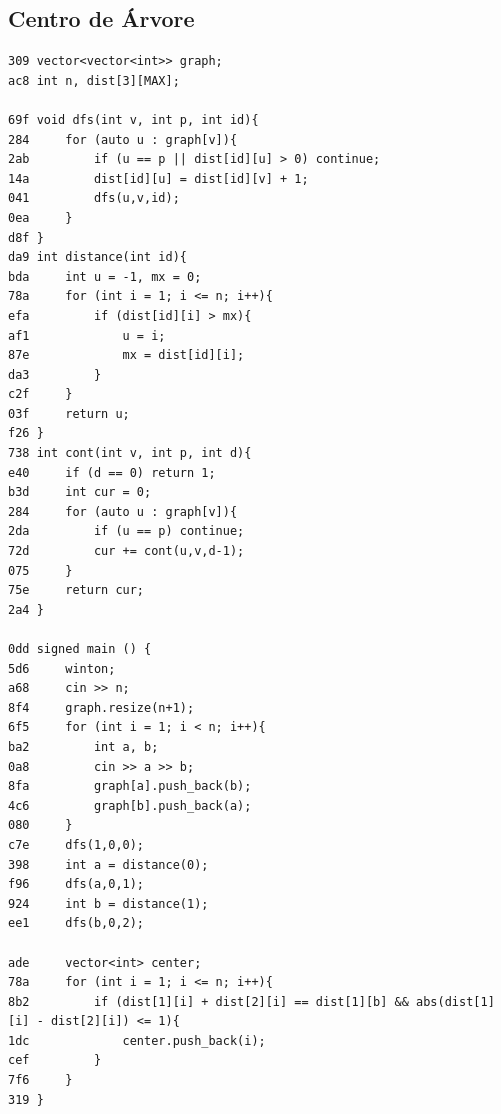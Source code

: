 \documentclass[11pt, a4paper, twoside]{article}
\begin{document}
\subsection{Centro de Árvore}
\begin{lstlisting}
309 vector<vector<int>> graph;
ac8 int n, dist[3][MAX];

69f void dfs(int v, int p, int id){
284     for (auto u : graph[v]){
2ab         if (u == p || dist[id][u] > 0) continue;
14a         dist[id][u] = dist[id][v] + 1;
041         dfs(u,v,id);
0ea     }
d8f }
da9 int distance(int id){
bda     int u = -1, mx = 0;
78a     for (int i = 1; i <= n; i++){
efa         if (dist[id][i] > mx){
af1             u = i;
87e             mx = dist[id][i];
da3         }
c2f     }
03f     return u;
f26 }
738 int cont(int v, int p, int d){
e40     if (d == 0) return 1;
b3d     int cur = 0;
284     for (auto u : graph[v]){
2da         if (u == p) continue;
72d         cur += cont(u,v,d-1);
075     }
75e     return cur;
2a4 }

0dd signed main () {
5d6     winton;
a68     cin >> n;
8f4     graph.resize(n+1);
6f5     for (int i = 1; i < n; i++){
ba2         int a, b;
0a8         cin >> a >> b;
8fa         graph[a].push_back(b);
4c6         graph[b].push_back(a);
080     }
c7e     dfs(1,0,0);
398     int a = distance(0);
f96     dfs(a,0,1);
924     int b = distance(1);
ee1     dfs(b,0,2);
    
ade     vector<int> center;
78a     for (int i = 1; i <= n; i++){
8b2         if (dist[1][i] + dist[2][i] == dist[1][b] && abs(dist[1][i] - dist[2][i]) <= 1){
1dc             center.push_back(i);
cef         }
7f6     }
319 }
\end{lstlisting}
\end{document}
